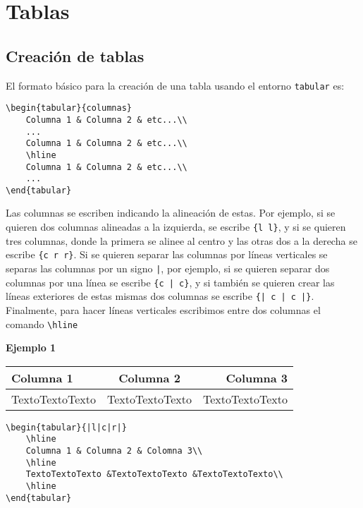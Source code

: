 	\section{Tablas}	

\subsection{Creación de tablas}

El formato básico para la creación de una tabla usando el entorno \verb|tabular| es:

\begin{myquote}
	\begin{lstlisting}
\begin{tabular}{columnas}
	Columna 1 & Columna 2 & etc...\\
	...
	Columna 1 & Columna 2 & etc...\\
	\hline
	Columna 1 & Columna 2 & etc...\\
	...
\end{tabular}				
	\end{lstlisting}			
\end{myquote}


Las columnas se escriben indicando la alineación de estas. Por ejemplo, si se quieren dos columnas alineadas a la izquierda, se escribe \verb|{l l}|, y si se quieren tres columnas, donde la primera se alinee al centro y las otras dos a la derecha se escribe \verb|{c r r}|. Si se quieren separar las columnas por líneas verticales se separas las columnas por un signo \verb+|+, por ejemplo, si se quieren separar dos columnas por una línea se escribe \verb+{c | c}+, y si también se quieren crear las líneas exteriores de estas mismas dos columnas se escribe \verb+{| c | c |}+. Finalmente, para hacer líneas verticales escribimos entre dos columnas el comando \verb|\hline|

\textbf{Ejemplo 1}

\begin{center}
	\begin{tabular}{|l|c|r|}		
		\hline	
		Columna 1 & Columna 2 & Columna 3\\	
		\hline			
		TextoTextoTexto & TextoTextoTexto & TextoTextoTexto\\	
		\hline		
	\end{tabular}
\end{center}	


\begin{myquote}				
	\begin{lstlisting}
\begin{tabular}{|l|c|r|}		
	\hline	
	Columna 1 & Columna 2 & Colomna 3\\	
	\hline	
	TextoTextoTexto &TextoTextoTexto &TextoTextoTexto\\	
	\hline		
\end{tabular}				
	\end{lstlisting}	
\end{myquote}


